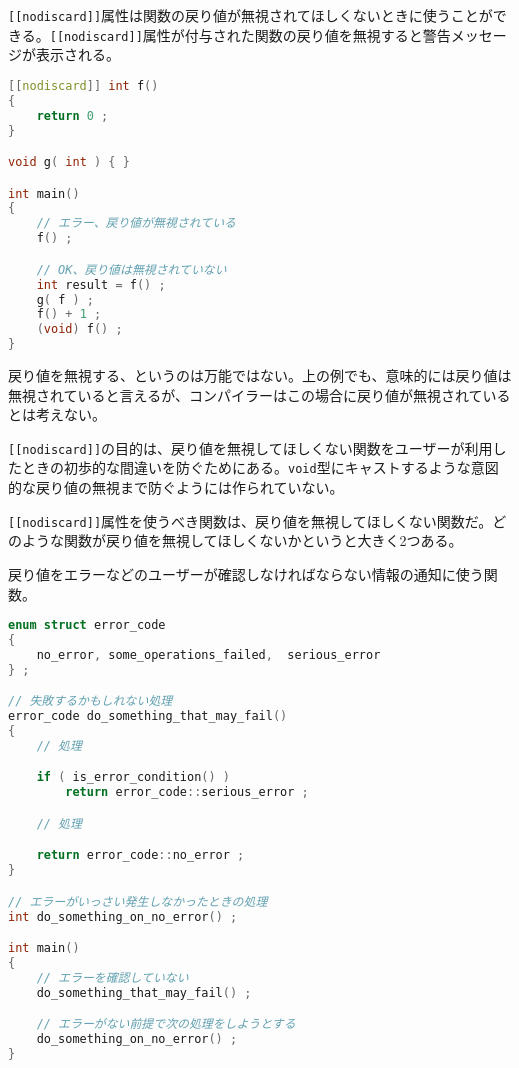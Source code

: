 %

\lstinline![[nodiscard]]!属性は関数の戻り値が無視されてほしくないときに使うことができる。\lstinline![[nodiscard]]!属性が付与された関数の戻り値を無視すると警告メッセージが表示される。

\begin{lstlisting}[language=C++]
[[nodiscard]] int f()
{
    return 0 ;
}

void g( int ) { }

int main()
{
    // エラー、戻り値が無視されている
    f() ;

    // OK、戻り値は無視されていない
    int result = f() ;
    g( f ) ;
    f() + 1 ;
    (void) f() ;
}
\end{lstlisting}

戻り値を無視する、というのは万能ではない。上の例でも、意味的には戻り値は無視されていると言えるが、コンパイラーはこの場合に戻り値が無視されているとは考えない。

\lstinline![[nodiscard]]!の目的は、戻り値を無視してほしくない関数をユーザーが利用したときの初歩的な間違いを防ぐためにある。\lstinline!void!型にキャストするような意図的な戻り値の無視まで防ぐようには作られていない。

\lstinline![[nodiscard]]!属性を使うべき関数は、戻り値を無視してほしくない関数だ。どのような関数が戻り値を無視してほしくないかというと大きく2つある。

戻り値をエラーなどのユーザーが確認しなければならない情報の通知に使う関数。

\begin{lstlisting}[language=C++]
enum struct error_code
{
    no_error, some_operations_failed,  serious_error
} ;

// 失敗するかもしれない処理
error_code do_something_that_may_fail()
{
    // 処理

    if ( is_error_condition() )
        return error_code::serious_error ;

    // 処理

    return error_code::no_error ;
}

// エラーがいっさい発生しなかったときの処理
int do_something_on_no_error() ;

int main()
{
    // エラーを確認していない
    do_something_that_may_fail() ;

    // エラーがない前提で次の処理をしようとする
    do_something_on_no_error() ;
}
\end{lstlisting}

